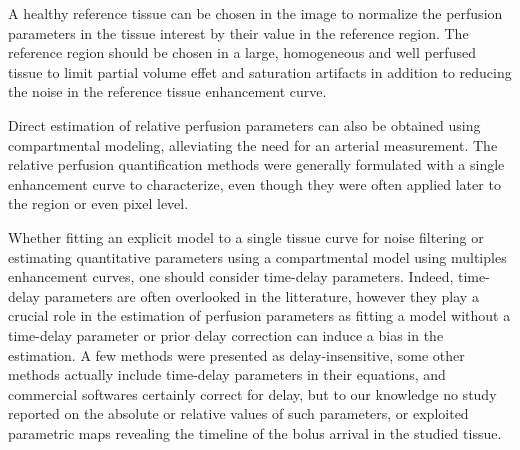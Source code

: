 A healthy reference tissue can be chosen in the image to normalize the perfusion parameters in the tissue interest by their value in the reference region.
The reference region should be chosen in a large, homogeneous and well perfused tissue to limit partial volume effet and saturation artifacts in addition to reducing the noise in the reference tissue enhancement curve.

Direct estimation of relative perfusion parameters can also be obtained using compartmental modeling, alleviating the need for an arterial measurement.
The relative perfusion quantification methods were generally formulated with a single enhancement curve to characterize, even though they were often applied later to the region or even pixel level.

Whether fitting an explicit model to a single tissue curve for noise filtering or estimating quantitative parameters using a compartmental model using multiples enhancement curves, one should consider time-delay parameters.
Indeed, time-delay parameters are often overlooked in the litterature, however they play a crucial role in the estimation of perfusion parameters as fitting a model without a time-delay parameter or prior delay correction can induce a bias in the estimation.
A few methods were presented as delay-insensitive, some other methods actually include time-delay parameters in their equations, and commercial softwares certainly correct for delay, but to our knowledge no study reported on the absolute or relative values of such parameters, or exploited parametric maps revealing the timeline of the bolus arrival in the studied tissue. 
